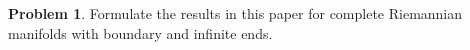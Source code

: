 \documentclass[reqno,11pt]{amsart}
\newcommand*\dif{\mathop{}\!\mathrm{d}}
\newcommand{\dfn}[1]{\emph{#1}\index{#1}}
\newtheorem{lemma}[theorem]{Lemma}
\theoremstyle{definition}
\newtheorem{problem}[theorem]{Problem}
\numberwithin{equation}{section}
\begin{document}
\begin{problem}
Formulate the results in this paper for complete Riemannian manifolds with boundary and infinite ends.
\end{problem}




\end{document}
